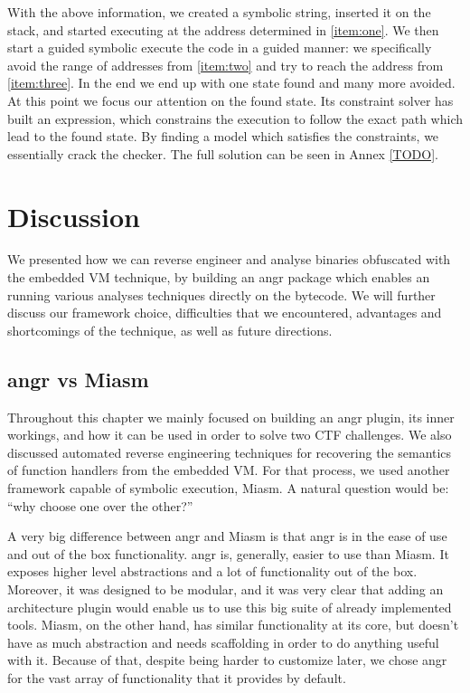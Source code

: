 With the above information, we created a symbolic string, inserted it on the stack, and started executing at the address determined in \ref{item:one}. We then start a guided symbolic execute the code in a guided manner: we specifically avoid the range of addresses from \ref{item:two} and try to reach the address from \ref{item:three}. In the end we end up with one state found and many more avoided. At this point we focus our attention on the found state. Its constraint solver has built an expression, which constrains the execution to follow the exact path which lead to the found state. By finding a model which satisfies the constraints, we essentially crack the checker. The full solution can be seen in Annex \ref{TODO}.

\section{Discussion}

We presented how we can reverse engineer and analyse binaries obfuscated with the embedded \gls{VM} technique, by building an angr package which enables an running various analyses techniques directly on the bytecode. We will further discuss our framework choice, difficulties that we encountered, advantages and shortcomings of the technique, as well as future directions.

\subsection{angr vs Miasm}

Throughout this chapter we mainly focused on building an angr plugin, its inner workings, and how it can be used in order to solve two \gls{CTF} challenges. We also discussed automated reverse engineering techniques for recovering the semantics of function handlers from the embedded \gls{VM}. For that process, we used another framework capable of symbolic execution, Miasm. A natural question would be: ``why choose one over the other?'' 

A very big difference between angr and Miasm is that angr is in the ease of use and out of the box functionality. angr is, generally, easier to use than Miasm. It exposes higher level abstractions and a lot of functionality out of the box. Moreover, it was designed to be modular, and it was very clear that adding an architecture plugin would enable us to use this big suite of already implemented tools. Miasm, on the other hand, has similar functionality at its core, but doesn't have as much abstraction and needs scaffolding in order to do anything useful with it. Because of that, despite being harder to customize later, we chose angr for the vast array of functionality that it provides by default.

